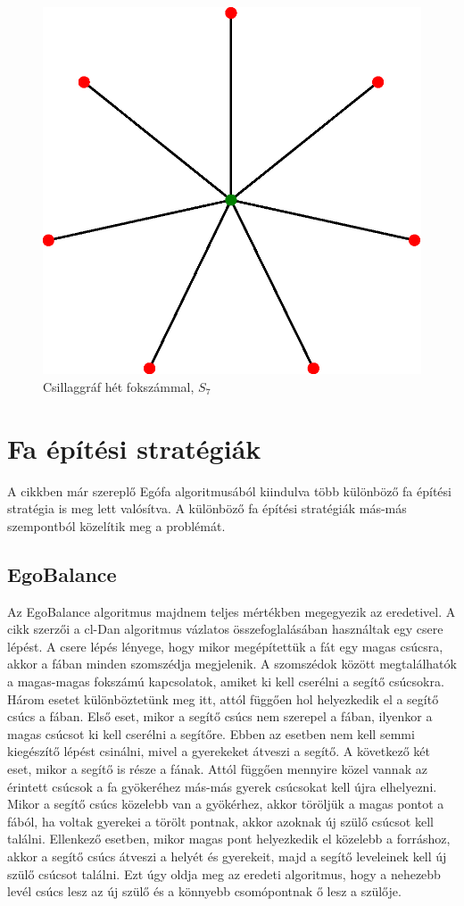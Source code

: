 \documentclass[12pt]{report}
\begin{document}
\begin{figure}[H]
	\begin{center}
		\includegraphics[width=0.4\linewidth]{pictures/Star_network_7.eps}
		\caption{Csillaggráf hét fokszámmal, \(S_7\) \cite{wikipedia_csillag}}
		\label{star}
	\end{center}
\end{figure}

\section{Fa építési stratégiák}

A cikkben \cite{avin_demand-aware_nodate} már szereplő Egófa algoritmusából kiindulva több különböző fa építési stratégia is meg lett valósítva.
A különböző fa építési stratégiák más-más szempontból közelítik meg a problémát.

\subsection{EgoBalance}

Az EgoBalance algoritmus majdnem teljes mértékben megegyezik az eredetivel.
A cikk szerzői a cl-Dan algoritmus vázlatos összefoglalásában használtak egy csere lépést.
A csere lépés lényege, hogy mikor megépítettük a fát egy magas csúcsra, akkor a fában minden szomszédja megjelenik.
A szomszédok között megtalálhatók a magas-magas fokszámú kapcsolatok, amiket ki kell cserélni a segítő csúcsokra.
Három esetet különböztetünk meg itt, attól függően hol helyezkedik el a segítő csúcs a fában.
Első eset, mikor a segítő csúcs nem szerepel a fában, ilyenkor a magas csúcsot ki kell cserélni a segítőre. Ebben az esetben nem kell semmi kiegészítő lépést csinálni, mivel a gyerekeket átveszi a segítő.
A következő két eset, mikor a segítő is része a fának. 
Attól függően mennyire közel vannak az érintett csúcsok a fa gyökeréhez más-más gyerek csúcsokat kell újra elhelyezni.
Mikor a segítő csúcs közelebb van a gyökérhez, akkor töröljük a magas pontot a fából, ha voltak gyerekei a törölt pontnak, akkor azoknak új szülő csúcsot kell találni.
Ellenkező esetben, mikor magas pont helyezkedik el közelebb a forráshoz, akkor a segítő csúcs átveszi a helyét és gyerekeit, majd a segítő leveleinek kell új szülő csúcsot találni. 
Ezt úgy oldja meg az eredeti algoritmus, hogy a nehezebb levél csúcs lesz az új szülő és a könnyebb csomópontnak ő lesz a szülője.
\end{document}

